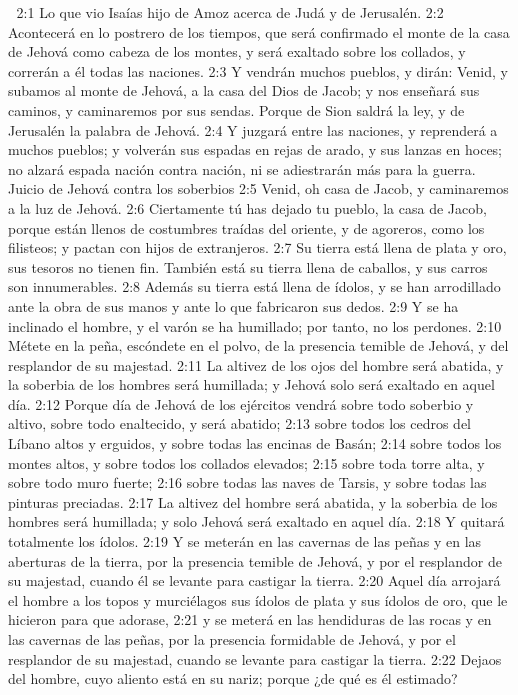 
2:1 Lo que vio Isaías hijo de Amoz acerca de Judá y de Jerusalén.  
2:2 Acontecerá en lo postrero de los tiempos, que será confirmado el monte de la casa de Jehová como cabeza de los montes, y será exaltado sobre los collados, y correrán a él todas las naciones.  
2:3 Y vendrán muchos pueblos, y dirán: Venid, y subamos al monte de Jehová, a la casa del Dios de Jacob; y nos enseñará sus caminos, y caminaremos por sus sendas. Porque de Sion saldrá la ley, y de Jerusalén la palabra de Jehová.  
2:4 Y juzgará entre las naciones, y reprenderá a muchos pueblos; y volverán sus espadas en rejas de arado, y sus lanzas en hoces; no alzará espada nación contra nación, ni se adiestrarán más para la guerra.  
Juicio de Jehová contra los soberbios  
2:5 Venid, oh casa de Jacob, y caminaremos a la luz de Jehová.  
2:6 Ciertamente tú has dejado tu pueblo, la casa de Jacob, porque están llenos de costumbres traídas del oriente, y de agoreros, como los filisteos; y pactan con hijos de extranjeros.  
2:7 Su tierra está llena de plata y oro, sus tesoros no tienen fin. También está su tierra llena de caballos, y sus carros son innumerables.  
2:8 Además su tierra está llena de ídolos, y se han arrodillado ante la obra de sus manos y ante lo que fabricaron sus dedos.  
2:9 Y se ha inclinado el hombre, y el varón se ha humillado; por tanto, no los perdones.  
2:10 Métete en la peña, escóndete en el polvo, de la presencia temible de Jehová, y del resplandor de su majestad.  
2:11 La altivez de los ojos del hombre será abatida, y la soberbia de los hombres será humillada; y Jehová solo será exaltado en aquel día.  
2:12 Porque día de Jehová de los ejércitos vendrá sobre todo soberbio y altivo, sobre todo enaltecido, y será abatido;  
2:13 sobre todos los cedros del Líbano altos y erguidos, y sobre todas las encinas de Basán;  
2:14 sobre todos los montes altos, y sobre todos los collados elevados;  
2:15 sobre toda torre alta, y sobre todo muro fuerte;  
2:16 sobre todas las naves de Tarsis, y sobre todas las pinturas preciadas.  
2:17 La altivez del hombre será abatida, y la soberbia de los hombres será humillada; y solo Jehová será exaltado en aquel día.  
2:18 Y quitará totalmente los ídolos.  
2:19 Y se meterán en las cavernas de las peñas y en las aberturas de la tierra, por la presencia temible de Jehová, y por el resplandor de su majestad, cuando él se levante para castigar la tierra.  
2:20 Aquel día arrojará el hombre a los topos y murciélagos sus ídolos de plata y sus ídolos de oro, que le hicieron para que adorase,  
2:21 y se meterá en las hendiduras de las rocas y en las cavernas de las peñas, por la presencia formidable de Jehová, y por el resplandor de su majestad, cuando se levante para castigar la tierra.  
2:22 Dejaos del hombre, cuyo aliento está en su nariz; porque ¿de qué es él estimado?  


